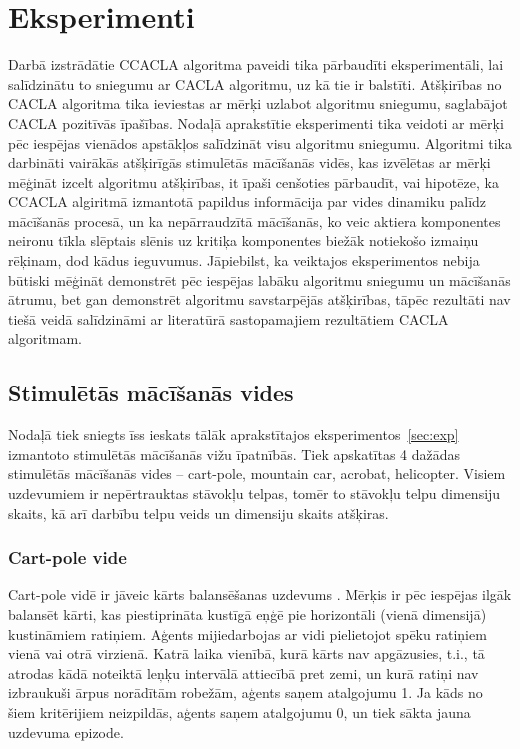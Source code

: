 \documentclass{ludis} %
\begin{document}
\chapter{Eksperimenti}
Darbā izstrādātie CCACLA algoritma paveidi tika pārbaudīti eksperimentāli, lai
salīdzinātu to sniegumu ar CACLA algoritmu, uz kā tie ir balstīti. Atšķirības no
CACLA algoritma tika ieviestas ar mērķi uzlabot algoritmu sniegumu, saglabājot
CACLA pozitīvās īpašības. Nodaļā aprakstītie eksperimenti tika veidoti ar mērķi
pēc iespējas vienādos apstākļos salīdzināt visu algoritmu sniegumu. Algoritmi
tika darbināti vairākās atšķirīgās stimulētās mācīšanās vidēs, kas izvēlētas ar
mērķi mēģināt izcelt algoritmu atšķirības, it īpaši cenšoties pārbaudīt, vai
hipotēze, ka CCACLA algiritmā izmantotā papildus informācija par vides dinamiku
palīdz mācīšanās procesā, un ka nepārraudzītā mācīšanās, ko veic aktiera
komponentes neironu tīkla slēptais slēnis uz kritiķa komponentes biežāk
notiekošo izmaiņu rēķinam, dod kādus ieguvumus. Jāpiebilst, ka veiktajos
eksperimentos nebija būtiski mēģināt demonstrēt pēc iespējas labāku algoritmu
sniegumu un mācīšanās ātrumu, bet gan demonstrēt algoritmu savstarpējās
atšķirības, tāpēc rezultāti nav tiešā veidā salīdzināmi ar literatūrā
sastopamajiem rezultātiem CACLA algoritmam.

\section{Stimulētās mācīšanās vides}
Nodaļā tiek sniegts īss ieskats tālāk aprakstītajos eksperimentos~\ref{sec:exp}
izmantoto stimulētās mācīšanās vižu īpatnībās. Tiek apskatītas 4 dažādas
stimulētās mācīšanās vides -- cart-pole, mountain car, acrobat, helicopter.
Visiem uzdevumiem ir nepērtrauktas stāvokļu telpas, tomēr to stāvokļu telpu
dimensiju skaits, kā arī darbību telpu veids un dimensiju skaits atšķiras.

\subsection{Cart-pole vide}
Cart-pole vidē ir jāveic kārts balansēšanas uzdevums \autocite{Barto}. Mērķis ir
pēc iespējas ilgāk balansēt kārti, kas piestiprināta kustīgā eņģē pie
horizontāli (vienā dimensijā) kustināmiem ratiņiem. Aģents mijiedarbojas ar vidi
pielietojot spēku ratiņiem vienā vai otrā virzienā. Katrā laika vienībā, kurā
kārts nav apgāzusies, t.i., tā atrodas kādā noteiktā leņķu intervālā attiecībā
pret zemi, un kurā ratiņi nav izbraukuši ārpus norādītām robežām, aģents saņem
atalgojumu 1. Ja kāds no šiem kritērijiem neizpildās, aģents saņem atalgojumu 0,
un tiek sākta jauna uzdevuma epizode.
\end{document}
